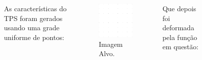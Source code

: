 \documentclass[t]{beamer}
\begin{document}
\begin{frame}
   \begin{columns}[c]
        As características do TPS foram gerados usando uma grade uniforme de pontos:
        \begin{figure}[!h]
          \begin{center}
            \includegraphics[width=1.0\textwidth]{../images/staticCPSSin.png}
            \caption{Imagem Alvo.}
          \end{center}
        \end{figure}
        Que depois foi deformada pela função em questão:
        \begin{figure}[!h]
          \begin{center}

\end{center}
\end{figure}
\end{columns}
\end{frame}
\end{document}
